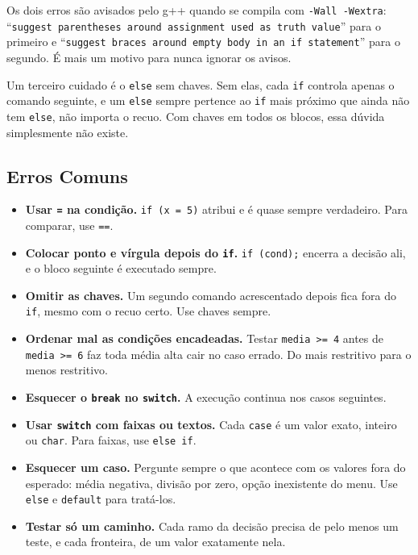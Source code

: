 Os dois erros são avisados pelo g++ quando se compila com \texttt{-Wall -Wextra}: ``\texttt{suggest parentheses around assignment used as truth value}'' para o primeiro e ``\texttt{suggest braces around empty body in an \textquotesingle{}if\textquotesingle{} statement}'' para o segundo. É mais um motivo para nunca ignorar os avisos.

Um terceiro cuidado é o \texttt{else} sem chaves. Sem elas, cada \texttt{if} controla apenas o comando seguinte, e um \texttt{else} sempre pertence ao \texttt{if} mais próximo que ainda não tem \texttt{else}, não importa o recuo. Com chaves em todos os blocos, essa dúvida simplesmente não existe.

\subsection{Erros Comuns}

\begin{itemize}
  \item \textbf{Usar \texttt{=} na condição.} \texttt{if (x = 5)} atribui e é quase sempre verdadeiro. Para comparar, use \texttt{==}.
  \item \textbf{Colocar ponto e vírgula depois do \texttt{if}.} \texttt{if (cond);} encerra a decisão ali, e o bloco seguinte é executado sempre.
  \item \textbf{Omitir as chaves.} Um segundo comando acrescentado depois fica fora do \texttt{if}, mesmo com o recuo certo. Use chaves sempre.
  \item \textbf{Ordenar mal as condições encadeadas.} Testar \texttt{media >= 4} antes de \texttt{media >= 6} faz toda média alta cair no caso errado. Do mais restritivo para o menos restritivo.
  \item \textbf{Esquecer o \texttt{break} no \texttt{switch}.} A execução continua nos casos seguintes.
  \item \textbf{Usar \texttt{switch} com faixas ou textos.} Cada \texttt{case} é um valor exato, inteiro ou \texttt{char}. Para faixas, use \texttt{else if}.
  \item \textbf{Esquecer um caso.} Pergunte sempre o que acontece com os valores fora do esperado: média negativa, divisão por zero, opção inexistente do menu. Use \texttt{else} e \texttt{default} para tratá-los.
  \item \textbf{Testar só um caminho.} Cada ramo da decisão precisa de pelo menos um teste, e cada fronteira, de um valor exatamente nela.
\end{itemize}

